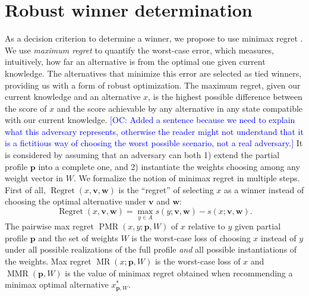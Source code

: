 \documentclass[a4paper,twoside]{article}
\newcommand{\commentOC}[1]{\textcolor{blue}{\small$\big[$OC: #1$\big]$}}
\newcommand{\profile}{\bm{v}}%
\newcommand{\pprofile}{{\bm{p}}}%
\newcommand{\w}{\bm{w}}
\newcommand{\pw}{W}%
\DeclareMathOperator{\Regret}{Regret}
\DeclareMathOperator{\PMR}{PMR}
\DeclareMathOperator{\MR}{MR}
\DeclareMathOperator{\MMR}{MMR}
\begin{document}
\section[Minimax regret under partial profile and weight information]{
Robust winner determination}
\label{sec:mmr}
As a decision criterion to determine a winner, we propose to use minimax regret \citep{Savage1954}. 
We use {\em maximum regret} to quantify the worst-case error, which measures, intuitively, how far an alternative is from the optimal one given current knowledge.
The alternatives that minimize this error are selected as tied winners, providing us with a form of robust optimization.
The maximum regret, given our current knowledge and an alternative $x$, is the highest possible difference between the score of $x$ and the score achievable by any alternative in any state compatible with our current knowledge. \commentOC{Added a sentence because we need to explain what this adversary represents, otherwise the reader might not understand that it is a fictitious way of choosing the worst possible scenario, not a real adversary.} It is considered by assuming that an adversary can both 1) extend the partial profile $\pprofile$ into a complete one, and 2) instantiate the weights choosing among any weight vector in $\pw$.
We formalize the notion of minimax regret in multiple steps.
First of all, $\Regret(x, \profile, \w)$ is the “regret” of selecting $x$ as a winner instead of choosing the optimal alternative under $\profile$ and $\w$:
\[\Regret(x, \profile, \w) = \max_{y \in A} s(y; \profile,\w) - s(x; \profile, \w).\]
The pairwise max regret $\PMR(x,y;\pprofile,W)$ of $x$ relative to $y$ given partial profile $\pprofile$ and the set of weights $W$ is the worst-case loss of choosing $x$ instead of $y$ under all possible realizations of the full profile {\em and} all possible instantiations of the weights. Max regret $\MR(x;\pprofile,W)$ is the worst-case loss of $x$ and $\MMR(\pprofile,W)$ is the value of minimax regret obtained when recommending a minimax optimal alternative $x^*_{\pprofile, W}$. 
\end{document}
